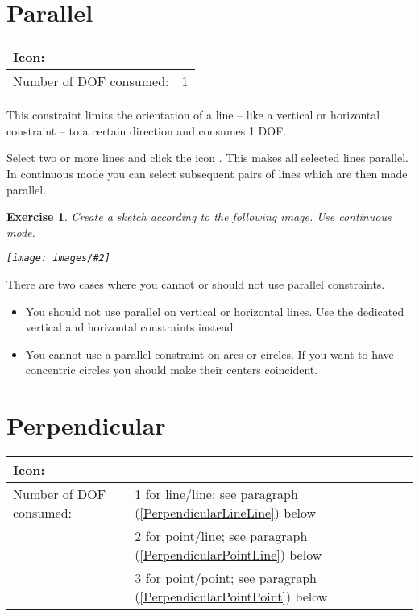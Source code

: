 \documentclass[12pt,titlepage]{article}
\newcommand{\icon}[1]{\raisebox{-1em}{\rule{0pt}{27pt}\texttt{[image: images/\#1]}}}
\newcommand{\img}[2]{\vspace{2ex}\noindent\texttt{[image: images/\#2]}}
\newcommand{\dofConsumed}{Number of DOF consumed:}
\newtheorem{Exercise}{Exercise}
\begin{document}
\section{Parallel}
\begin{tabular}{|l|l|}
\hline
Icon: & \icon{Constraint_Parallel}\\
\hline
\dofConsumed & 1 \\
\hline
\end{tabular}

This constraint limits the orientation of a line -- like a vertical or horizontal constraint -- to
a certain direction and consumes 1 DOF.

Select two or more lines and click the icon \icon{Constraint_Parallel}. This makes
all selected lines parallel. In continuous mode you can select subsequent pairs of
lines which are then made parallel.

\begin{Exercise}
Create a sketch according to the following image. Use continuous mode.

\img{width=0.6\textwidth}{Parallelogramm}
\end{Exercise}

There are two cases where you cannot or should not use parallel constraints.
\begin{itemize}
\item You should not use parallel on vertical or horizontal lines. Use the dedicated
      vertical and horizontal constraints instead
\item You cannot use a parallel constraint on arcs or circles. If you want to have
      concentric circles you should make their centers coincident.
\end{itemize}

\section{Perpendicular}
\begin{tabular}{|l|l|}
\hline
Icon: & \icon{Constraint_Perpendicular}\\
\hline
\dofConsumed & 1 for line/line;
                            see paragraph (\ref{PerpendicularLineLine}) below \\
                        & 2 for point/line;
                            see paragraph (\ref{PerpendicularPointLine}) below \\
                        & 3 for point/point;
                            see paragraph (\ref{PerpendicularPointPoint}) below \\
\hline
\end{tabular}
\end{document}
